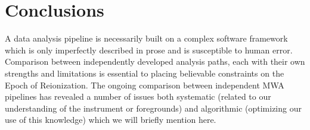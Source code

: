 \documentclass[preprint2]{aastex}
\def\chipscite{Trott et al 2015}
\def\dilloncite{Dillon et al 2015 }
\begin{document}


\section{Conclusions}
\label{sec:conclusion}
      A data analysis pipeline is necessarily built on a complex software framework which is only imperfectly described in prose and is susceptible to human error.  Comparison between independently developed analysis paths, each with their own strengths and limitations is essential to placing believable constraints on the Epoch of Reionization. The ongoing comparison between independent MWA pipelines has revealed a number of issues both systematic (related to our understanding of the instrument or foregrounds) and algorithmic (optimizing our use of this knowledge) which we will briefly mention here.
      
\end{document}
